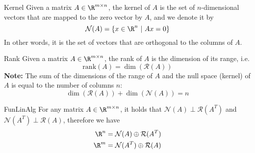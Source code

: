 \begin{theo}[Kernel]{Kernel}
    Given a matrix $A \in \R^{m \times n}$, the kernel of $A$ is the set of $n$-dimensional vectors that are mapped to the zero vector by $A$, and we denote it by
    \begin{equation*}
        \mathcal{N}(A) = \{ x \in \R^n \ | \ Ax = 0 \}
    \end{equation*}
    In other words, it is the set of vectors that are orthogonal to the columns of $A$.
\end{theo}

\newpage

\begin{theo}[Rank]{Rank}
    Given a matrix $A \in \R^{m \times n}$, the rank of $A$ is the dimension of its range, i\@.e\@.
    \begin{equation*}
        \text{rank}(A) = \dim(\mathcal{R}(A))
    \end{equation*}
    \textbf{Note:} The sum of the dimensions of the range of $A$ and the null space (kernel) of $A$ is equal to the number of columns $n$:
    \begin{equation*}
        \dim(\mathcal{R}(A)) + \dim(\mathcal{N}(A)) = n
    \end{equation*}
    \vspace{-0.5cm}
\end{theo}

\begin{theo}{FunLinAlg}
    For any matrix $A \in \R^{m \times n}$, it holds that $\mathcal{N}(A) \perp \mathcal{R}(A^T)$ and $\mathcal{N}(A^T) \perp \mathcal{R}(A)$, therefore we have 
    \begin{align*}
        \R^n &= \mathcal{N}(A) \oplus \mathcal{R}(A^T) \\
        \R^m &= \mathcal{N}(A^T) \oplus \mathcal{R}(A)
    \end{align*}
    \vspace*{-0.5cm}
\end{theo}


